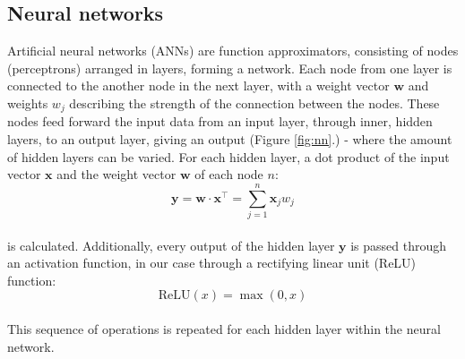 \documentclass{article}
\begin{document}
\subsection{Neural networks}
Artificial neural networks (ANNs) are function approximators, consisting of nodes (perceptrons) arranged in layers, forming a network. Each node from one layer is connected to the another node in the next layer, with a weight vector $\textbf{w}$ and weights $w_j$ describing the strength of the connection between the nodes. These nodes feed forward the input data from an input layer, through inner, hidden layers, to an output layer, giving an output (Figure \ref{fig:nn}.) - where the amount of hidden layers can be varied. For each hidden layer, a dot product of the input vector $\textbf{x}$ and the weight vector $\textbf{w}$ of each node $n$:
\begin{equation}
    \textbf{y} = \textbf{w}\cdot \textbf{x}^{\top} = \sum_{j=1}^{n} \textbf{x}_jw_j
\end{equation}
\\
is calculated. Additionally, every output of the hidden layer $\textbf{y}$ is passed through an activation function, in our case through a rectifying linear unit (ReLU) function:
\begin{equation}
    \text{ReLU}(x) = \max(0,x)
\end{equation}
\\
This sequence of operations is repeated for each hidden layer within the neural network.
\end{document}
